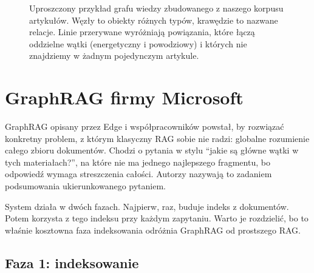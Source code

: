\documentclass[11pt,a4paper]{article}
\begin{document}
\begin{figure}[h!]
\caption{Uproszczony przykład grafu wiedzy zbudowanego z naszego korpusu artykułów. Węzły to
obiekty różnych typów, krawędzie to nazwane relacje. Linie przerywane wyróżniają powiązania,
które łączą oddzielne wątki (energetyczny i powodziowy) i których nie znajdziemy w żadnym
pojedynczym artykule.}
\label{fig:kg}
\end{figure}

\section{GraphRAG firmy Microsoft}

GraphRAG opisany przez Edge i współpracowników \cite{edge2024} powstał, by rozwiązać
konkretny problem, z którym klasyczny RAG sobie nie radzi: globalne rozumienie całego zbioru
dokumentów. Chodzi o pytania w stylu \enquote{jakie są główne wątki w tych materiałach?}, na
które nie ma jednego najlepszego fragmentu, bo odpowiedź wymaga streszczenia całości. Autorzy
nazywają to zadaniem podsumowania ukierunkowanego pytaniem.

System działa w dwóch fazach. Najpierw, raz, buduje indeks z dokumentów. Potem korzysta z
tego indeksu przy każdym zapytaniu. Warto je rozdzielić, bo to właśnie kosztowna faza
indeksowania odróżnia GraphRAG od prostszego RAG.

\subsection{Faza 1: indeksowanie}
\end{document}
